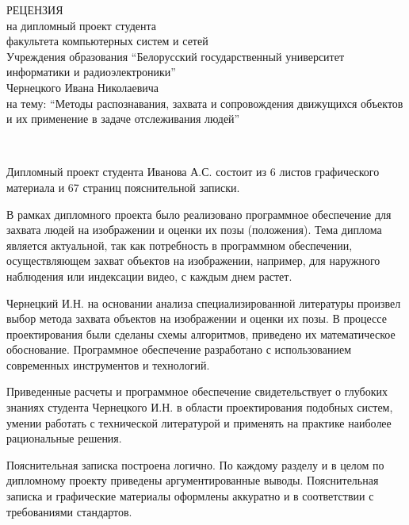 \thispagestyle{empty}

\begin{singlespace}
  {\small
    \begin{center}
      \begin{minipage}{0.8\textwidth}
        \begin{center}
          {\normalsize РЕЦЕНЗИЯ}\\[0.2cm]
          на дипломный проект студента\\
          факультета компьютерных систем и сетей\\
          Учреждения образования ``Белорусский государственный университет информатики и радиоэлектроники''\\
          Чернецкого Ивана Николаевича\\
          на тему: ``Методы распознавания, захвата и сопровождения движущихся объектов и их применение в задаче отслеживания людей''
        \end{center}
      \end{minipage}\\[3cm]
    \end{center}

    Дипломный проект студента Иванова А.С. состоит из 6 листов графического материала и 67 страниц пояснительной записки.

    В рамках дипломного проекта было реализовано программное обеспечение для захвата людей на изображении и оценки их позы (положения). Тема диплома является актуальной, так как потребность в программном обеспечении, осуществляющем захват объектов на изображении, например, для наружного наблюдения или индексации видео, с каждым днем растет.

   Чернецкий И.Н. на основании анализа специализированной литературы произвел выбор метода захвата объектов на изображении и оценки их позы. В процессе проектирования были сделаны схемы алгоритмов, приведено их математическое обоснование. Программное обеспечение разработано с использованием современных инструментов и технологий.

   Приведенные расчеты и программное обеспечение свидетельствует о глубоких знаниях студента Чернецкого И.Н. в области проектирования подобных систем, умении работать с технической литературой и применять на практике наиболее рациональные решения.

    Пояснительная записка построена логично. По каждому разделу и в целом по дипломному проекту приведены аргументированные выводы. Пояснительная записка и графические материалы оформлены аккуратно и в соответствии с требованиями стандартов.

}
\end{singlespace}
